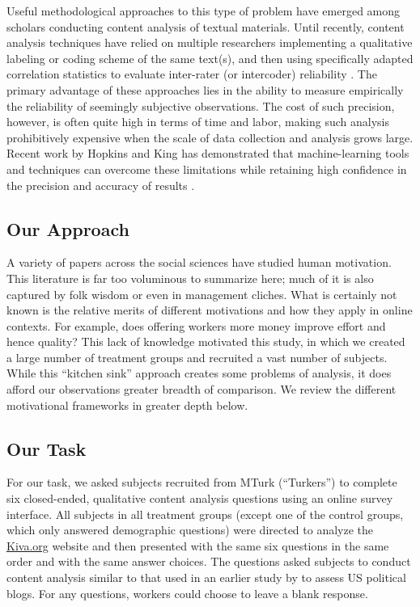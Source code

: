 \documentclass{cscw2010}
\begin{document}
Useful methodological approaches to this type of problem have emerged
among scholars conducting content analysis of textual materials. Until
recently, content analysis techniques have relied on multiple
researchers implementing a qualitative labeling or coding scheme of
the same text(s), and then using specifically adapted correlation
statistics to evaluate inter-rater (or intercoder) reliability
\cite{krippendorff_content_2003, cohen_coefficient_1960}. The primary
advantage of these approaches lies in the ability to measure
empirically the reliability of seemingly subjective observations. The
cost of such precision, however, is often quite high in terms of time
and labor, making such analysis prohibitively expensive when the scale
of data collection and analysis grows large. Recent work by Hopkins
and King has demonstrated that machine-learning tools and techniques
can overcome these limitations while retaining high
confidence in the precision and accuracy of results
\cite{Hopkins-King2010}.

\subsection{Our Approach} 
A variety of papers across the social sciences have studied
human motivation. This literature is far too voluminous to summarize
here; much of it is also captured by folk wisdom or even in management
cliches. What is certainly not known is the relative merits of
different motivations and how they apply in online contexts. For
example, does offering workers more money improve effort and hence
quality? This lack of knowledge motivated this study, in which we
created a large number of treatment groups and recruited a vast number
of subjects. While this ``kitchen sink'' approach creates some
problems of analysis, it does afford our observations greater breadth
of comparison. We review the different motivational frameworks in greater
depth below.

\subsection{Our Task}
For our task, we asked subjects recruited from MTurk (``Turkers'') to complete six closed-ended,
qualitative content analysis questions using an online survey
interface. All subjects in all treatment groups (except one of the
control groups, which only answered demographic questions) were
directed to analyze the \href{http://www.kiva.org}{Kiva.org} website and then presented with the same
six questions in the same order and with the same answer choices. The questions asked subjects to conduct
content analysis similar to that used in an earlier study by
\cite{benklershaw2010} to assess US political blogs. For any
questions, workers could choose to leave a blank response.
\end{document}
